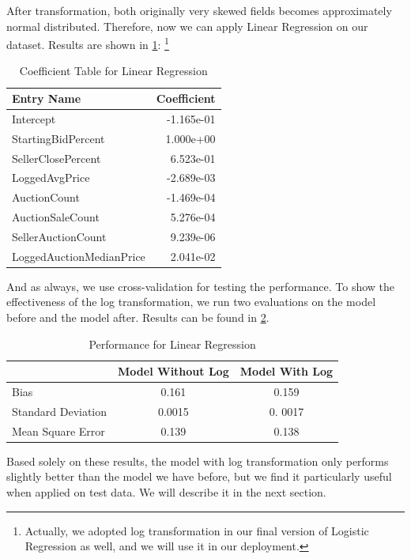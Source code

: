 \documentclass[CEJM,PDF]{cej} %
\begin{document}
After transformation, both originally very skewed fields becomes approximately normal distributed. Therefore, now we can apply Linear Regression on our dataset. Results are shown in \ref{r-linear}:
\footnote{Actually, we adopted log transformation in our final version of Logistic Regression as well, and we will use it in our deployment. }
\begin{table}[h]
\centering
\caption{Coefficient Table for Linear Regression}
\label{r-linear}
\begin{tabular}{@{}|l|r|@{}}
\toprule
\hline
Entry Name  & Coefficient \\ \midrule
\hline
Intercept & -1.165e-01   \\
\hline
StartingBidPercent & 1.000e+00 \\
\hline
SellerClosePercent & 6.523e-01  \\
\hline
LoggedAvgPrice & -2.689e-03 \\
\hline
AuctionCount & -1.469e-04   \\
\hline
AuctionSaleCount & 5.276e-04 \\
\hline
SellerAuctionCount & 9.239e-06   \\
\hline
LoggedAuctionMedianPrice & 2.041e-02  \\ \bottomrule
\hline
\end{tabular}
\end{table}

And as always, we use cross-validation for testing the performance. To show the effectiveness of the log transformation, we run two evaluations on the model before and the model after.  Results can be found in \ref{comp}.

\begin{table}[h]
\centering
\caption{Performance for Linear Regression}
\label{comp}
\begin{tabular}{@{}|l|c|c|@{}}
\toprule
\hline
    & Model Without Log  & Model With Log \\ \midrule
\hline
  Bias  &  0.161 & 0.159  \\ 
\hline
  Standard Deviation  &  0.0015  &  0. 0017 \\ 
\hline
  Mean Square Error    &  0.139  &  0.138  \\
\bottomrule \hline
\end{tabular}
\end{table}

Based solely on these results, the model with log transformation only performs slightly better than the model we have before, but we find it particularly useful when applied on test data. We will describe it in the next section.
\end{document}
